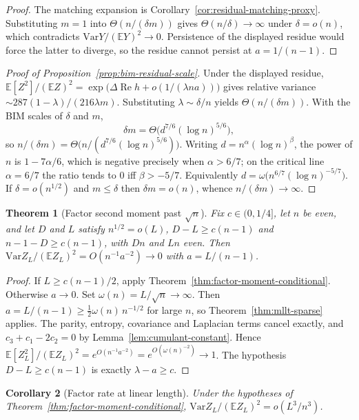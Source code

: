 \documentclass[11pt]{article}
\newtheorem{theorem}{Theorem}
\newtheorem{corollary}[theorem]{Corollary}
\newcommand{\EE}{\mathbb{E}}
\newcommand{\Var}{\mathrm{Var}}
\begin{document}
\begin{proof}
The matching expansion is Corollary~\ref{cor:residual-matching-proxy}. Substituting
\(m=1\) into \(\Theta(n/(\delta m))\) gives \(\Theta(n/\delta)\to\infty\) under
\(\delta=o(n)\), which contradicts \(\Var Y/(\EE Y)^2\to0\). Persistence of the
displayed residue would force the latter to diverge, so the residue cannot
persist at \(a=1/(n-1)\).
\end{proof}

\begin{proof}[Proof of Proposition~\ref{prop:bim-residual-scale}]
Under the displayed residue,
\(\EE[Z^2]/(\EE Z)^2=\exp\bigl(\Delta\operatorname{Re}h+o(1/(\lambda na))\bigr)\)
gives relative variance \(\sim 287(1-\lambda)/(216\lambda m)\). Substituting
\(\lambda\sim\delta/n\) yields \(\Theta(n/(\delta m))\). With the BIM scales of
\(\delta\) and \(m\),
\[
\delta m
=
\Theta\bigl(d^{7/6}(\log n)^{5/6}\bigr),
\]
so \(n/(\delta m)=\Theta\bigl(n/(d^{7/6}(\log n)^{5/6})\bigr)\). Writing
\(d=n^\alpha(\log n)^\beta\), the power of \(n\) is \(1-7\alpha/6\), which is
negative precisely when \(\alpha>6/7\); on the critical line \(\alpha=6/7\) the
ratio tends to \(0\) iff \(\beta>-5/7\). Equivalently
\(d=\omega\bigl(n^{6/7}(\log n)^{-5/7}\bigr)\). If \(\delta=o(n^{1/2})\) and
\(m\le\delta\) then \(\delta m=o(n)\), whence \(n/(\delta m)\to\infty\).
\end{proof}

\begin{theorem}[Factor second moment past \(\sqrt n\)]
\label{thm:factor-moment-sparse}
Fix \(c\in(0,1/4]\), let \(n\) be even, and let \(D\) and \(L\) satisfy
\(n^{1/2}=o(L)\), \(D-L\ge c(n-1)\) and \(n-1-D\ge c(n-1)\), with \(Dn\) and
\(Ln\) even. Then \(\Var Z_L/(\EE Z_L)^2=O(n^{-1}a^{-2})\to0\) with
\(a=L/(n-1)\).
\end{theorem}

\begin{proof}
If \(L\ge c(n-1)/2\), apply Theorem~\ref{thm:factor-moment-conditional}.
Otherwise \(a\to0\). Set \(\omega(n)=L/\sqrt n\to\infty\). Then
\(a=L/(n-1)\ge\frac12\omega(n)\,n^{-1/2}\) for large \(n\), so
Theorem~\ref{thm:mllt-sparse} applies. The parity, entropy, covariance and
Laplacian terms cancel exactly, and \(c_3+c_1-2c_2=0\) by
Lemma~\ref{lem:cumulant-constant}. Hence
\(\EE[Z_L^2]/(\EE Z_L)^2=e^{O(n^{-1}a^{-2})}=e^{O(\omega(n)^{-2})}\to1\).
The hypothesis \(D-L\ge c(n-1)\) is exactly \(\lambda-a\ge c\).
\end{proof}

\begin{corollary}[Factor rate at linear length]
\label{cor:factor-rate-linear}
Under the hypotheses of Theorem~\ref{thm:factor-moment-conditional},
\(\Var Z_L/(\EE Z_L)^2=o(L^3/n^3)\).
\end{corollary}
\end{document}
